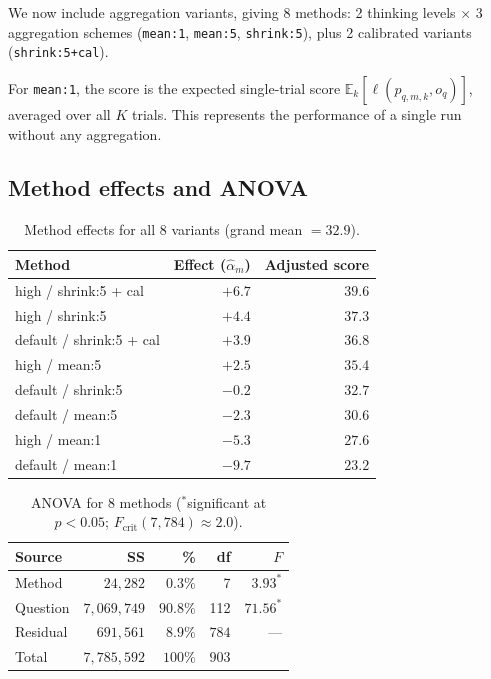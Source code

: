 \documentclass[11pt]{article}
\begin{document}
We now include aggregation variants, giving 8 methods:
2 thinking levels $\times$ 3 aggregation schemes (\texttt{mean:1},
\texttt{mean:5}, \texttt{shrink:5}), plus 2 calibrated variants
(\texttt{shrink:5+cal}).

For \texttt{mean:1}, the score is the expected single-trial score
$\mathbb{E}_k[\ell(p_{q,m,k}, o_q)]$, averaged over all $K$ trials.
This represents the performance of a single run without any aggregation.

\subsection{Method effects and ANOVA}

\begin{table}[h]
\centering
\begin{tabular}{lrr}
\toprule
Method & Effect ($\hat{\alpha}_m$) & Adjusted score \\
\midrule
high / shrink:5 + cal & $+6.7$ & $39.6$ \\
high / shrink:5 & $+4.4$ & $37.3$ \\
default / shrink:5 + cal & $+3.9$ & $36.8$ \\
high / mean:5 & $+2.5$ & $35.4$ \\
default / shrink:5 & $-0.2$ & $32.7$ \\
default / mean:5 & $-2.3$ & $30.6$ \\
high / mean:1 & $-5.3$ & $27.6$ \\
default / mean:1 & $-9.7$ & $23.2$ \\
\bottomrule
\end{tabular}
\caption{Method effects for all 8 variants (grand mean $= 32.9$).}
\label{tab:expanded_effects}
\end{table}

\begin{table}[h]
\centering
\begin{tabular}{lrrrr}
\toprule
Source & SS & \% & df & $F$ \\
\midrule
Method & $24{,}282$ & $0.3\%$ & 7 & $3.93^*$ \\
Question & $7{,}069{,}749$ & $90.8\%$ & 112 & $71.56^*$ \\
Residual & $691{,}561$ & $8.9\%$ & $784$ & --- \\
\midrule
Total & $7{,}785{,}592$ & $100\%$ & $903$ & \\
\bottomrule
\end{tabular}
\caption{ANOVA for 8 methods ($^*$significant at $p < 0.05$;
  $F_{\mathrm{crit}}(7, 784) \approx 2.0$).}
\label{tab:expanded_anova}
\end{table}
\end{document}
